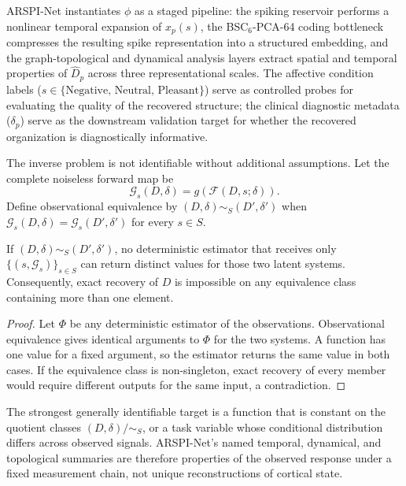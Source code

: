 ARSPI-Net instantiates $\phi$ as a staged pipeline: the spiking reservoir performs a nonlinear temporal expansion of $x_p(s)$, the BSC$_6$-PCA-64 coding bottleneck compresses the resulting spike representation into a structured embedding, and the graph-topological and dynamical analysis layers extract spatial and temporal properties of $\hat{D}_p$ across three representational scales. The affective condition labels ($s \in \{\text{Negative, Neutral, Pleasant}\}$) serve as controlled probes for evaluating the quality of the recovered structure; the clinical diagnostic metadata ($\delta_p$) serve as the downstream validation target for whether the recovered organization is diagnostically informative.

The inverse problem is not identifiable without additional assumptions. Let the
complete noiseless forward map be
\begin{equation}
    \mathcal{G}_s(D,\delta)=g\!\left(\mathcal{F}(D,s;\delta)\right).
\end{equation}
Define observational equivalence by $(D,\delta)\sim_S(D',\delta')$ when
$\mathcal{G}_s(D,\delta)=\mathcal{G}_s(D',\delta')$ for every $s\in S$.

\begin{proposition}
\label{prop:inverse_nonidentifiability}
If $(D,\delta)\sim_S(D',\delta')$, no deterministic estimator that receives only
$\{(s,\mathcal{G}_s)\}_{s\in S}$ can return distinct values for those two latent
systems. Consequently, exact recovery of $D$ is impossible on any equivalence
class containing more than one element.
\end{proposition}

\begin{proof}
Let $\Phi$ be any deterministic estimator of the observations. Observational
equivalence gives identical arguments to $\Phi$ for the two systems. A function
has one value for a fixed argument, so the estimator returns the same value in
both cases. If the equivalence class is non-singleton, exact recovery of every
member would require different outputs for the same input, a contradiction.
\end{proof}

\begin{corollary}
The strongest generally identifiable target is a function that is constant on
the quotient classes $(D,\delta)/{\sim_S}$, or a task variable whose conditional
distribution differs across observed signals. ARSPI-Net's named temporal,
dynamical, and topological summaries are therefore properties of the observed
response under a fixed measurement chain, not unique reconstructions of cortical
state.
\end{corollary}

